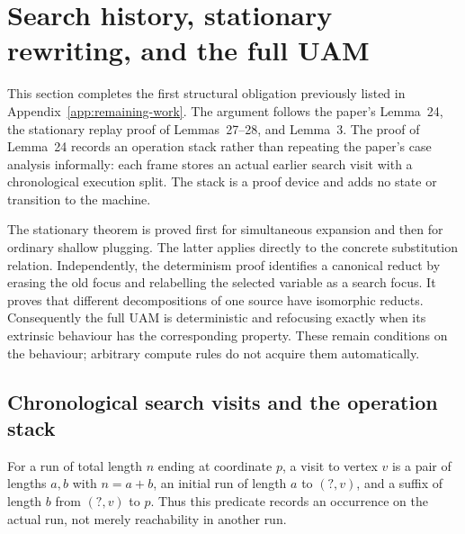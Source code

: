 \section{Search history, stationary rewriting, and the full UAM}
\label{sec:uam-structure}
This section completes the first structural obligation previously listed in
Appendix~\ref{app:remaining-work}. The argument follows the paper's
Lemma~24, the stationary replay proof of Lemmas~27--28, and Lemma~3.
The proof of Lemma~24 records an operation stack rather than repeating the
paper's case analysis informally: each frame stores an actual earlier search
visit with a chronological execution split. The stack is a proof device and
adds no state or transition to the machine.

The stationary theorem is proved first for simultaneous expansion and then
for ordinary shallow plugging. The latter applies directly to the concrete
substitution relation. Independently, the determinism proof identifies a
canonical reduct by erasing the old focus and relabelling the selected variable
as a search focus. It proves that different decompositions of one source have
isomorphic reducts. Consequently the full UAM is deterministic and refocusing
exactly when its extrinsic behaviour has the corresponding property.
These remain conditions on the behaviour; arbitrary compute rules do not
acquire them automatically.

\subsection{Chronological search visits and the operation stack}


\begin{definition}
For a run of total length $n$ ending at coordinate $p$, a visit to vertex $v$
is a pair of lengths $a,b$ with $n=a+b$, an initial run of length $a$ to
$(?,v)$, and a suffix of length $b$ from $(?,v)$ to $p$. Thus this predicate
records an occurrence on the actual run, not merely reachability in another run.
\end{definition}


